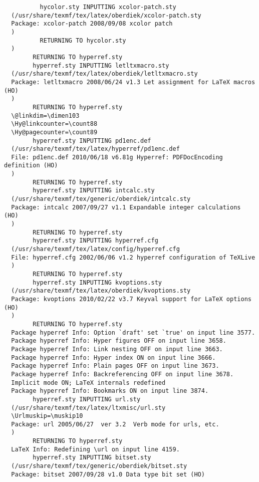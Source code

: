\documentclass[fleqn]{article}%
\begin{document}
\begin{verbatim}
          hycolor.sty INPUTTING xcolor-patch.sty 
  (/usr/share/texmf/tex/latex/oberdiek/xcolor-patch.sty
  Package: xcolor-patch 2008/09/08 xcolor patch
  )
          RETURNING TO hycolor.sty 
  )
        RETURNING TO hyperref.sty 
        hyperref.sty INPUTTING letltxmacro.sty 
  (/usr/share/texmf/tex/latex/oberdiek/letltxmacro.sty
  Package: letltxmacro 2008/06/24 v1.3 Let assignment for LaTeX macros (HO)
  )
        RETURNING TO hyperref.sty 
  \@linkdim=\dimen103
  \Hy@linkcounter=\count88
  \Hy@pagecounter=\count89
        hyperref.sty INPUTTING pd1enc.def 
  (/usr/share/texmf/tex/latex/hyperref/pd1enc.def
  File: pd1enc.def 2010/06/18 v6.81g Hyperref: PDFDocEncoding definition (HO)
  )
        RETURNING TO hyperref.sty 
        hyperref.sty INPUTTING intcalc.sty 
  (/usr/share/texmf/tex/generic/oberdiek/intcalc.sty
  Package: intcalc 2007/09/27 v1.1 Expandable integer calculations (HO)
  )
        RETURNING TO hyperref.sty 
        hyperref.sty INPUTTING hyperref.cfg 
  (/usr/share/texmf/tex/latex/config/hyperref.cfg
  File: hyperref.cfg 2002/06/06 v1.2 hyperref configuration of TeXLive
  )
        RETURNING TO hyperref.sty 
        hyperref.sty INPUTTING kvoptions.sty 
  (/usr/share/texmf/tex/latex/oberdiek/kvoptions.sty
  Package: kvoptions 2010/02/22 v3.7 Keyval support for LaTeX options (HO)
  )
        RETURNING TO hyperref.sty 
  Package hyperref Info: Option `draft' set `true' on input line 3577.
  Package hyperref Info: Hyper figures OFF on input line 3658.
  Package hyperref Info: Link nesting OFF on input line 3663.
  Package hyperref Info: Hyper index ON on input line 3666.
  Package hyperref Info: Plain pages OFF on input line 3673.
  Package hyperref Info: Backreferencing OFF on input line 3678.
  Implicit mode ON; LaTeX internals redefined
  Package hyperref Info: Bookmarks ON on input line 3874.
        hyperref.sty INPUTTING url.sty 
  (/usr/share/texmf/tex/latex/ltxmisc/url.sty
  \Urlmuskip=\muskip10
  Package: url 2005/06/27  ver 3.2  Verb mode for urls, etc.
  )
        RETURNING TO hyperref.sty 
  LaTeX Info: Redefining \url on input line 4159.
        hyperref.sty INPUTTING bitset.sty 
  (/usr/share/texmf/tex/generic/oberdiek/bitset.sty
  Package: bitset 2007/09/28 v1.0 Data type bit set (HO)
  

\end{verbatim}
\end{document}
